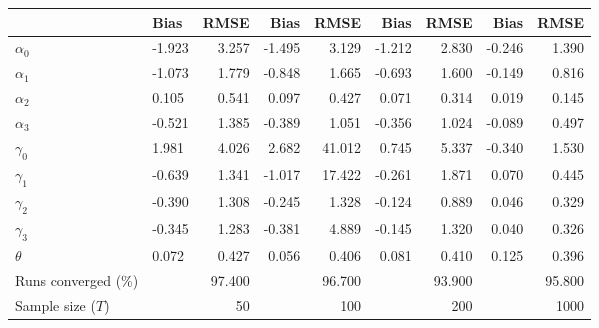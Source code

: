 
\begin{tabular}[t]{llrrrrrrr}
\toprule
  & Bias & RMSE & Bias & RMSE & Bias & RMSE & Bias & RMSE\\
\midrule
$\alpha_{0}$ & -1.923 & 3.257 & -1.495 & 3.129 & -1.212 & 2.830 & -0.246 & 1.390\\
$\alpha_{1}$ & -1.073 & 1.779 & -0.848 & 1.665 & -0.693 & 1.600 & -0.149 & 0.816\\
$\alpha_{2}$ & 0.105 & 0.541 & 0.097 & 0.427 & 0.071 & 0.314 & 0.019 & 0.145\\
$\alpha_{3}$ & -0.521 & 1.385 & -0.389 & 1.051 & -0.356 & 1.024 & -0.089 & 0.497\\
$\gamma_{0}$ & 1.981 & 4.026 & 2.682 & 41.012 & 0.745 & 5.337 & -0.340 & 1.530\\
$\gamma_{1}$ & -0.639 & 1.341 & -1.017 & 17.422 & -0.261 & 1.871 & 0.070 & 0.445\\
$\gamma_{2}$ & -0.390 & 1.308 & -0.245 & 1.328 & -0.124 & 0.889 & 0.046 & 0.329\\
$\gamma_{3}$ & -0.345 & 1.283 & -0.381 & 4.889 & -0.145 & 1.320 & 0.040 & 0.326\\
$\theta$ & 0.072 & 0.427 & 0.056 & 0.406 & 0.081 & 0.410 & 0.125 & 0.396\\
Runs converged (\%) &  & 97.400 &  & 96.700 &  & 93.900 &  & 95.800\\
Sample size ($T$) &  & 50 &  & 100 &  & 200 &  & 1000\\
\bottomrule
\end{tabular}
